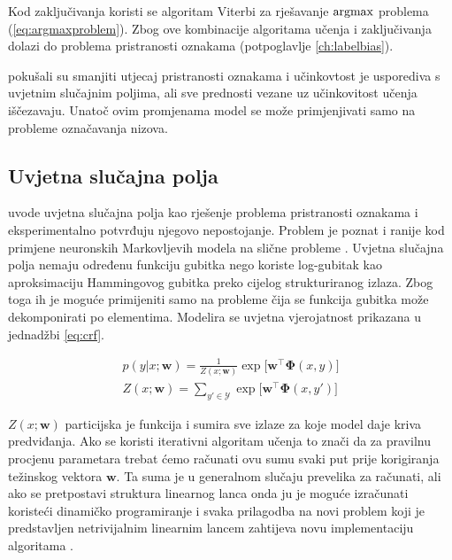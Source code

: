 Kod zaključivanja koristi se algoritam Viterbi za rješavanje $\operatorname*{argmax}$ problema
(\ref{eq:argmaxproblem}). Zbog ove kombinacije algoritama učenja i zaključivanja
dolazi do problema pristranosti oznakama (potpoglavlje \ref{ch:labelbias}).

\cite{cohen05ijcai} pokušali su smanjiti utjecaj pristranosti oznakama i
učinkovtost je usporediva s uvjetnim slučajnim poljima, ali sve prednosti vezane
uz učinkovitost učenja iščezavaju. Unatoč ovim promjenama model se može
primjenjivati samo na probleme označavanja nizova.


\subsection{Uvjetna slučajna polja}

\citet*{lafferty2001conditional} uvode uvjetna slučajna polja kao rješenje
problema pristranosti oznakama i eksperimentalno potvrđuju njegovo nepostojanje.
Problem je poznat i ranije kod primjene neuronskih Markovljevih modela na slične
probleme \citep{leon1991approche}. Uvjetna slučajna polja nemaju određenu
funkciju gubitka nego koriste log-gubitak kao aproksimaciju Hammingovog gubitka
preko cijelog strukturiranog izlaza. Zbog toga ih je moguće primijeniti samo na
probleme čija se funkcija gubitka može dekomponirati po elementima. Modelira se
uvjetna vjerojatnost prikazana u jednadžbi \ref{eq:crf}.

\begin{equation}\label{eq:crf}
\begin{aligned}
  p(y | x; \mathbf{w}) = \frac{1}{Z(x; \mathbf{w})} \exp \big[ \mathbf{w}^\top \mathbf{\Phi}(x, y)\big] \\
  Z(x; \mathbf{w}) = \sum_{y' \in \mathcal{Y}} \exp \big[ \mathbf{w}^\top \mathbf{\Phi}(x, y')\big]
\end{aligned}
\end{equation}

$Z(x; \mathbf{w})$ particijska je funkcija i sumira sve izlaze za koje model
daje kriva predviđanja. Ako se koristi iterativni algoritam učenja to znači da
za pravilnu procjenu parametara trebat ćemo računati ovu sumu svaki put prije
korigiranja težinskog vektora $\mathbf{w}$. Ta suma je u generalnom slučaju
prevelika za računati, ali ako se pretpostavi struktura linearnog lanca onda ju
je moguće izračunati koristeći dinamičko programiranje i svaka prilagodba na
novi problem koji je predstavljen netrivijalnim linearnim lancem zahtijeva novu
implementaciju algoritama \citep{lafferty2001conditional, sha2003shallow}.

